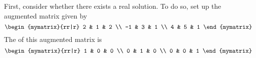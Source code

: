 \begin{solution}
First, consider whether there exists a real solution. To do so, set up the augmented matrix given by
\begin{equation*}
\begin{mymatrix}{rr|r}
2 & 1 & 2 \\
-1 & 3 & 1 \\
4 & 5 & 1
\end{mymatrix}
\end{equation*}
The {\rref} of this augmented matrix is
\begin{equation*}
\begin{mymatrix}{rr|r}
1 & 0 & 0 \\
0 & 1 & 0 \\
0 & 0 & 1
\end{mymatrix}
\end{equation*}


\end{solution}
